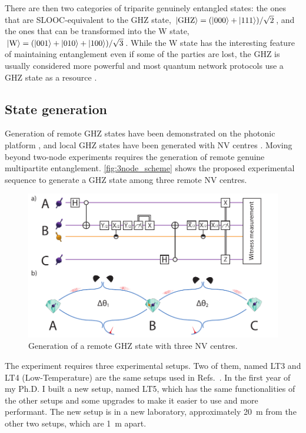 \documentclass[a4paper, twoside]{article}
\begin{document}
There are then two categories of triparite genuinely entangled states: the ones that are \ac{SLOOC}-equivalent to the \ac{GHZ} state, $\ket{\text{GHZ}} = (\ket{000} + \ket{111})/\sqrt 2 $, and the ones that can be transformed into the W state, $\ket{\text{W}} = (\ket{001} + \ket{010} + \ket{100})/\sqrt 3 $. While the W state has the interesting feature of maintaining entanglement even if some of the parties are lost, the \ac{GHZ} is usually considered more powerful and most quantum network protocols use a GHZ state as a resource . 

\subsection{State generation}

Generation of remote GHZ states have been demonstrated on the photonic platform \cite{Bouwmeester1999}, and local GHZ states have been generated with \ac{NV} centres . Moving beyond two-node experiments requires the generation of remote genuine multipartite entanglement. \autoref{fig:3node_scheme} shows the proposed experimental sequence to generate a GHZ state among three remote \ac{NV} centres.

\begin{figure}
	\includegraphics[width=\textwidth]{images/figure3}
	\caption{Generation of a remote GHZ state with three \ac{NV} centres.}
	\label{fig:3node_scheme}
\end{figure}

The experiment requires three experimental setups. Two of them, named LT3 and LT4 (Low-Temperature) are the same setups used in Refs.~\cite{Kalb2017, Humphreys2018}.
In the first year of my Ph.D. I built a new setup, named LT5, which has the same functionalities of the other setups and some upgrades to make it easier to use and more performant. The new setup is in a new laboratory, approximately \SI{20}{m} from the other two setups, which are \SI{1}{m} apart.
\end{document}
